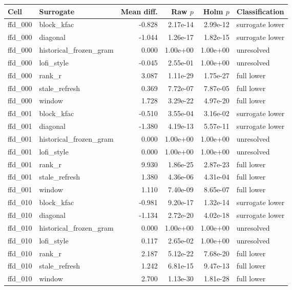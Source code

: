 \begin{table}[p]
\centering\tiny
\begin{tabular}{llrrrl}
\toprule
Cell & Surrogate & Mean diff. & Raw $p$ & Holm $p$ & Classification \\
\midrule
ffd\_000 & block\_kfac & -0.828 & 2.17e-14 & 2.99e-12 & surrogate lower \\
ffd\_000 & diagonal & -1.044 & 1.26e-17 & 1.82e-15 & surrogate lower \\
ffd\_000 & historical\_frozen\_gram & 0.000 & 1.00e+00 & 1.00e+00 & unresolved \\
ffd\_000 & lofi\_style & -0.045 & 2.55e-01 & 1.00e+00 & unresolved \\
ffd\_000 & rank\_r & 3.087 & 1.11e-29 & 1.75e-27 & full lower \\
ffd\_000 & stale\_refresh & 0.369 & 7.72e-07 & 7.87e-05 & full lower \\
ffd\_000 & window & 1.728 & 3.29e-22 & 4.97e-20 & full lower \\
ffd\_001 & block\_kfac & -0.510 & 3.55e-04 & 3.16e-02 & surrogate lower \\
ffd\_001 & diagonal & -1.380 & 4.19e-13 & 5.57e-11 & surrogate lower \\
ffd\_001 & historical\_frozen\_gram & 0.000 & 1.00e+00 & 1.00e+00 & unresolved \\
ffd\_001 & lofi\_style & 0.000 & 1.00e+00 & 1.00e+00 & unresolved \\
ffd\_001 & rank\_r & 9.930 & 1.86e-25 & 2.87e-23 & full lower \\
ffd\_001 & stale\_refresh & 1.380 & 4.36e-06 & 4.31e-04 & full lower \\
ffd\_001 & window & 1.110 & 7.40e-09 & 8.65e-07 & full lower \\
ffd\_010 & block\_kfac & -0.981 & 9.20e-17 & 1.32e-14 & surrogate lower \\
ffd\_010 & diagonal & -1.134 & 2.72e-20 & 4.02e-18 & surrogate lower \\
ffd\_010 & historical\_frozen\_gram & 0.000 & 1.00e+00 & 1.00e+00 & unresolved \\
ffd\_010 & lofi\_style & 0.117 & 2.65e-02 & 1.00e+00 & unresolved \\
ffd\_010 & rank\_r & 2.187 & 5.12e-22 & 7.68e-20 & full lower \\
ffd\_010 & stale\_refresh & 1.242 & 6.81e-15 & 9.47e-13 & full lower \\
ffd\_010 & window & 2.700 & 1.13e-30 & 1.81e-28 & full lower \\

\end{tabular}
\end{table}
